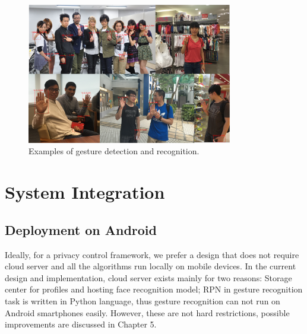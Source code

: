 \begin{figure}[!htbp]
    \centering
    \includegraphics[width=0.8\textwidth]{figure/ch4-gestpredemp.png}
    \caption{Examples of gesture detection and recognition.}
    \label{fig:ch4-gestpredictemp}
\end{figure}



\section{System Integration}

\subsection{Deployment on Android}

Ideally, for a privacy control framework, we prefer a design that does not require cloud server and all the algorithms run locally on mobile devices. In the current design and implementation, cloud server exists mainly for two reasons:  Storage center for profiles and hosting face recognition model;  RPN in gesture recognition task is written in Python language, thus gesture recognition can not run on Android smartphones easily. However, these are not hard restrictions, possible improvements are discussed in Chapter 5.

